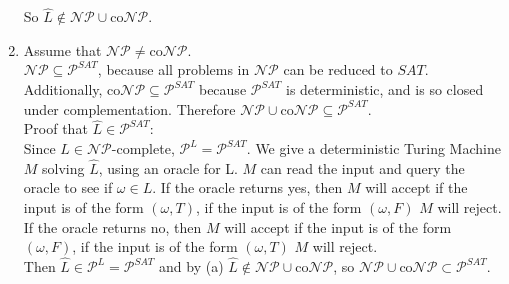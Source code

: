\documentclass{assignment}
\begin{document}
\begin{problemlist}
\begin{answer}
\begin{enumerate}
So $\hat{L} \notin \mathcal{NP}\cup \text{co}\mathcal{NP}$.
\item Assume that $\mathcal{NP} \neq \text{co}\mathcal{NP}$.\\
$\mathcal{NP} \subseteq \mathcal{P}^{SAT}$, because all problems in $\mathcal{NP}$ can be reduced to $SAT$. Additionally, co$\mathcal{NP} \subseteq \mathcal{P}^{SAT}$ because $\mathcal{P}^{SAT}$ is deterministic, and is so closed under complementation. Therefore $\mathcal{NP} \cup \text{co}\mathcal{NP} \subseteq \mathcal{P}^{SAT}$.\\
Proof that $\hat{L} \in \mathcal{P}^{SAT}$:\\
Since $L \in \mathcal{NP}$-complete, $\mathcal{P}^{L} = \mathcal{P}^{SAT}$. We give a deterministic Turing Machine $M$ solving $\hat{L}$, using an oracle for L. $M$ can read the input and query the oracle to see if $\omega \in L$. If the oracle returns yes, then $M$ will accept if the input is of the form $(\omega,T)$, if the input is of the form $(\omega,F)$ $M$ will reject. If the oracle returns no, then $M$ will accept if the input is of the form $(\omega,F)$, if the input is of the form $(\omega,T)$ $M$ will reject.\\
Then $\hat{L} \in \mathcal{P}^L = \mathcal{P}^{SAT}$ and by (a) $\hat{L} \notin \mathcal{NP} \cup \text{co}\mathcal{NP}$, so $\mathcal{NP} \cup \text{co}\mathcal{NP} \subset \mathcal{P}^{SAT}$.\\
\end{enumerate}
\end{answer}
\end{problemlist}
\end{document}
